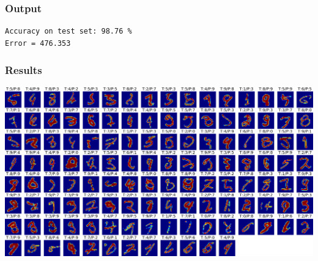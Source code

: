 \documentclass{article}
\begin{document}


\subsubsection{Output}
\begin{lstlisting}[title=Console Output]
Accuracy on test set: 98.76 %
Error = 476.353
\end{lstlisting}

\subsubsection{Results}
\includegraphics[width=\textwidth]{mnist.png}
\end{document}
